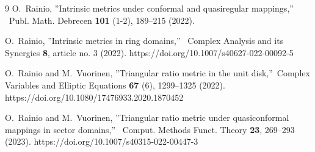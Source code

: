 \documentclass[12pt,a4paper]{amsart}
\begin{document}
\begin{thebibliography}{9}
O.~Rainio, ''Intrinsic metrics under conformal and quasiregular mappings,'' \ Publ. Math. Debrecen \textbf{101} (1-2), 189--215 (2022).

O.~Rainio, ''Intrinsic metrics in ring domains,'' \ Complex Analysis and its Synergies \textbf{8}, article no. 3 (2022). %
https://doi.org/10.1007/s40627-022-00092-5

O.~Rainio and M.~Vuorinen, ''Triangular ratio metric in the unit disk,''\
Complex Variables and Elliptic Equations
\textbf{67} (6),  1299--1325 (2022).
https://doi.org/10.1080/17476933.2020.1870452

O.~Rainio and M.~Vuorinen, ''Triangular ratio metric under quasiconformal mappings in sector domains,'' \ Comput. Methods
Funct. Theory \textbf{23},  269--293 (2023).
https://doi.org/10.1007/s40315-022-00447-3



\end{thebibliography}
\end{document}
